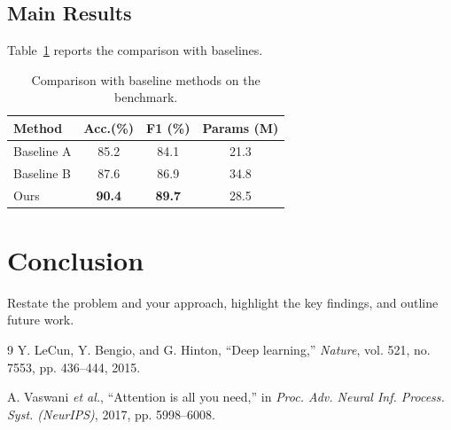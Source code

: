 \subsection{Main Results}
Table~\ref{tab:results} reports the comparison with baselines.

\begin{table}[!t]
  \centering
  \caption{Comparison with baseline methods on the benchmark.}
  \label{tab:results}
  \begin{tabular}{lccc}
    \toprule
    Method & Acc.(\%) & F1 (\%) & Params (M) \\
    \midrule
    Baseline A        & 85.2 & 84.1 & 21.3 \\
    Baseline B        & 87.6 & 86.9 & 34.8 \\
    Ours              & \textbf{90.4} & \textbf{89.7} & 28.5 \\
    \bottomrule
  \end{tabular}
\end{table}


\section{Conclusion}
Restate the problem and your approach, highlight the key findings,
and outline future work.

\begin{thebibliography}{9}
Y. LeCun, Y. Bengio, and G. Hinton,
``Deep learning,''
\emph{Nature}, vol. 521, no. 7553, pp. 436--444, 2015.

A. Vaswani \emph{et al.},
``Attention is all you need,''
in \emph{Proc. Adv. Neural Inf. Process. Syst. (NeurIPS)}, 2017, pp. 5998--6008.
\end{thebibliography}


